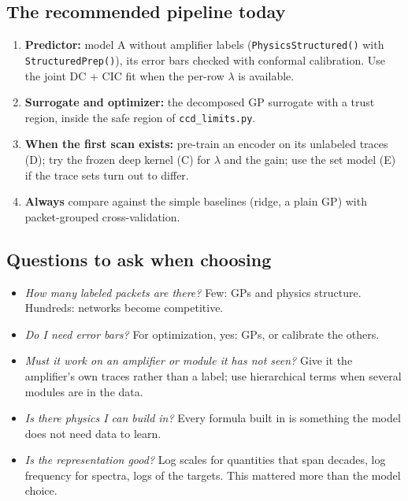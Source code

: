 \documentclass[11pt]{article}
\newcommand{\code}[1]{\texttt{#1}}
\begin{document}
\subsection{The recommended pipeline today}
\begin{enumerate}
\item \textbf{Predictor:} model A without amplifier labels (\code{PhysicsStructured()} with \code{StructuredPrep()}), its error bars
  checked with conformal calibration. Use the joint DC + CIC fit when the per-row $\lambda$ is available.
\item \textbf{Surrogate and optimizer:} the decomposed GP surrogate with a trust region, inside the safe region of
  \code{ccd\_limits.py}.
\item \textbf{When the first scan exists:} pre-train an encoder on its unlabeled traces (D); try the frozen deep kernel (C) for
  $\lambda$ and the gain; use the set model (E) if the trace sets turn out to differ.
\item \textbf{Always} compare against the simple baselines (ridge, a plain GP) with packet-grouped cross-validation.
\end{enumerate}

\subsection{Questions to ask when choosing}
\begin{itemize}
\item \emph{How many labeled packets are there?} Few: GPs and physics structure. Hundreds: networks become competitive.
\item \emph{Do I need error bars?} For optimization, yes: GPs, or calibrate the others.
\item \emph{Must it work on an amplifier or module it has not seen?} Give it the amplifier's own traces rather than a label;
  use hierarchical terms when several modules are in the data.
\item \emph{Is there physics I can build in?} Every formula built in is something the model does not need data to learn.
\item \emph{Is the representation good?} Log scales for quantities that span decades, log frequency for spectra, logs of the
  targets. This mattered more than the model choice.
\end{itemize}

\appendix
\end{document}
